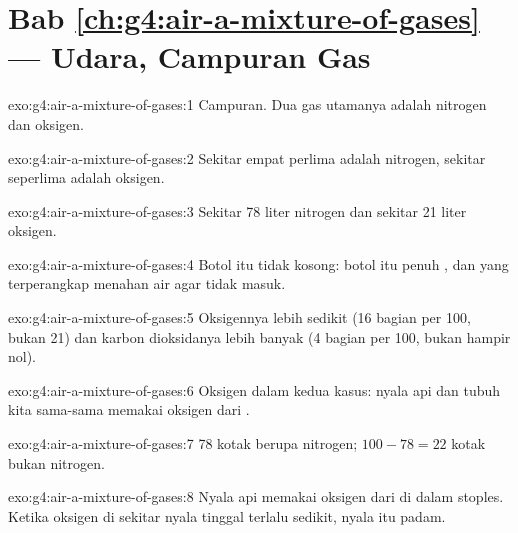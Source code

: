 \section*{Bab \ref{ch:g4:air-a-mixture-of-gases} --- Udara, Campuran Gas}

\begin{solution}{exo:g4:air-a-mixture-of-gases:1}
Campuran. Dua gas utamanya adalah nitrogen dan oksigen.
\end{solution}

\begin{solution}{exo:g4:air-a-mixture-of-gases:2}
Sekitar empat perlima  adalah nitrogen, sekitar seperlima adalah
oksigen.
\end{solution}

\begin{solution}{exo:g4:air-a-mixture-of-gases:3}
Sekitar 78 liter nitrogen dan sekitar 21 liter oksigen.
\end{solution}

\begin{solution}{exo:g4:air-a-mixture-of-gases:4}
Botol itu tidak kosong: botol itu penuh , dan  yang
terperangkap menahan air agar tidak masuk.
\end{solution}

\begin{solution}{exo:g4:air-a-mixture-of-gases:5}
Oksigennya lebih sedikit (16 bagian per 100, bukan 21) dan karbon
dioksidanya lebih banyak (4 bagian per 100, bukan hampir nol).
\end{solution}

\begin{solution}{exo:g4:air-a-mixture-of-gases:6}
Oksigen dalam kedua kasus: nyala api dan tubuh kita sama-sama memakai
oksigen dari .
\end{solution}

\begin{solution}{exo:g4:air-a-mixture-of-gases:7}
78 kotak berupa nitrogen; $100 - 78 = 22$ kotak bukan nitrogen.
\end{solution}

\begin{solution}{exo:g4:air-a-mixture-of-gases:8}
Nyala api memakai oksigen dari  di dalam stoples. Ketika oksigen
di sekitar nyala tinggal terlalu sedikit, nyala itu padam.
\end{solution}

